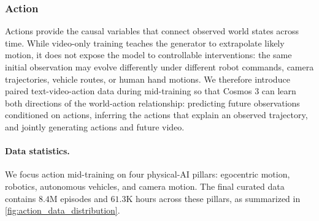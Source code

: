 \subsubsection{Action}
\label{subsubsec::data_gen_action}

Actions provide the causal variables that connect observed world states across time. While video-only training teaches the generator to extrapolate likely motion, it does not expose the model to controllable interventions: the same initial observation may evolve differently under different robot commands, camera trajectories, vehicle routes, or human hand motions. We therefore introduce paired text-video-action data during mid-training so that Cosmos 3 can learn both directions of the world-action relationship: predicting future observations conditioned on actions, inferring the actions that explain an observed trajectory, and jointly generating actions and future video.

\paragraph{Data statistics.} We focus action mid-training on four physical-AI pillars: egocentric motion, robotics, autonomous vehicles, and camera motion. The final curated data contains $8.4$M episodes and $61.3$K hours across these pillars, as summarized in \cref{fig:action_data_distribution}.



